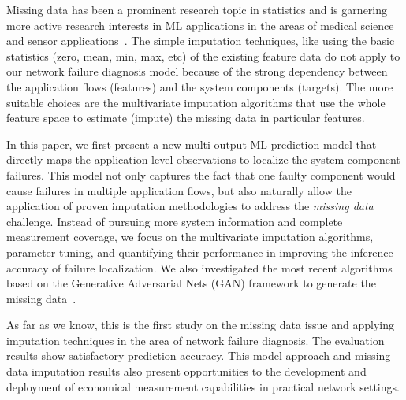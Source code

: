 Missing data has been a prominent research topic in statistics and is garnering more active research interests
in ML applications in the areas of medical science~\cite{DONDERS20061087} and sensor applications~\cite{missingdata:sensor:20}. The simple imputation techniques, like using the basic statistics (zero, mean, min, max, etc) of the existing feature data do not apply to our network failure diagnosis model because of the strong dependency between the application flows (features) and the system components (targets).   
The more suitable choices are the multivariate imputation algorithms that use the whole feature space to estimate (impute) the missing data in particular features.

In this paper, we first present a new multi-output ML prediction model that directly maps the application level observations to localize the system component failures. 
This model not only captures the fact that one faulty component would cause failures in multiple application flows, but also naturally allow the application of 
proven imputation methodologies to address the {\it missing data} challenge. Instead of pursuing more system information and complete measurement coverage, we focus on the multivariate imputation algorithms, parameter tuning, and quantifying their performance in improving the inference accuracy of failure localization. We also investigated the most recent algorithms based on the Generative Adversarial Nets (GAN) framework to generate the missing data~\cite{Yoon2018GAINMD,Awan2021ImputationOM}.

As far as we know, this is the first study on the missing data issue and applying imputation techniques in the area of network failure diagnosis. The evaluation results 
show satisfactory prediction accuracy. This model approach and missing data imputation results also present opportunities to the development and deployment of 
economical measurement capabilities in practical network settings.     









